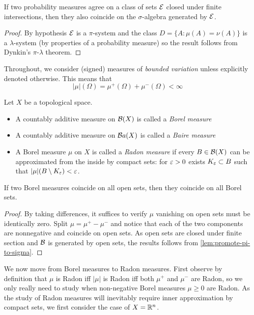 \begin{lemma}
  \label{lem:promote-pi-to-sigma}
  If two probability measures agree on a class of sets $\mathcal{E}$ closed under
  finite intersections, then they also coincide on the $\sigma$-algebra
  generated by $\mathcal{E}$.
\end{lemma}

\begin{proof}
  By hypothesis $\mathcal{E}$ is a $\pi$-system
  and the class $D = \{A : \mu(A) = \nu(A)\}$ is a $\lambda$-system
  (by properties of a probability measure) so the result
  follows from Dynkin's $\pi$-$\lambda$ theorem.
\end{proof}

Throughout, we consider (signed) measures of \emph{bounded variation}
unless explicitly denoted otherwise. This means that
\[
  \lvert \mu \rvert(\Omega)
  = \mu^+(\Omega) + \mu^-(\Omega) < \infty
\]

\begin{definition}
  Let $X$ be a topological space.
  \begin{itemize}
    \item A countably additive measure on $\mathcal{B}(X)$ is called a
      \emph{Borel measure}
    \item A countably additive measure on $\mathcal{B} a(X)$ is called a
      \emph{Baire measure}
    \item A Borel measure $\mu$ on $X$ is called a \emph{Radon measure}
      if every $B \in \mathcal{B}(X)$ can be approximated from the inside
      by compact sets: for $\varepsilon > 0$ exists $K_\varepsilon \subset B$
      such that $\lvert \mu \rvert(B \setminus K_\varepsilon) < \varepsilon$.
  \end{itemize}
\end{definition}

\begin{lemma}
  If two Borel measures coincide on all open sets, then they
  coincide on all Borel sets.
\end{lemma}

\begin{proof}
  By taking differences, it suffices to verify $\mu$ vanishing
  on open sets must be identically zero.
  Split $\mu = \mu^+ - \mu^-$ and notice that each of the two
  components are nonnegative and coincide on open sets.
  As open sets are closed under finite section and $\mathcal{B}$
  is generated by open sets, the results follows from
  \cref{lem:promote-pi-to-sigma}.
\end{proof}

We now move from Borel measures to Radon measures.
First observe by definition that $\mu$ is Radon iff $\lvert \mu \rvert$ is
Radon iff both $\mu^+$ and $\mu^-$ are Radon, so we only really
need to study when non-negative Borel measures $\mu \geq 0$ are Radon.
As the study of Radon measures will inevitably require inner approximation
by compact sets, we first consider the case of $X = \mathbb{R}^n$.

